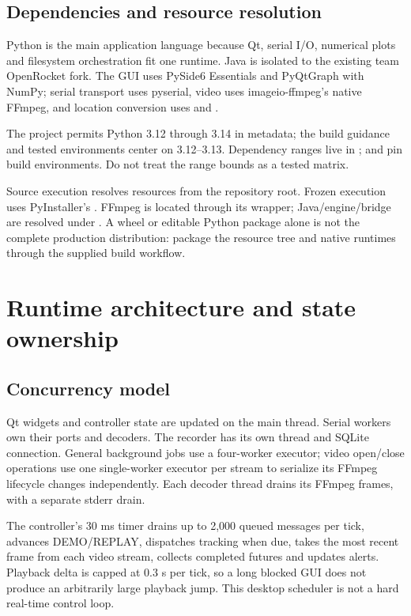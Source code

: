 \subsection{Dependencies and resource resolution}
Python is the main application language because Qt, serial I/O, numerical plots
and filesystem orchestration fit one runtime. Java is isolated to the existing
team OpenRocket fork. The GUI uses PySide6 Essentials and PyQtGraph with NumPy;
serial transport uses pyserial, video uses imageio-ffmpeg's native FFmpeg, and
location conversion uses  and .

The project permits Python 3.12 through 3.14 in metadata; the build guidance and
tested environments center on 3.12--3.13. Dependency ranges live in
;  and  pin build
environments. Do not treat the range bounds as a tested matrix.

Source execution resolves resources from the repository root. Frozen execution
uses PyInstaller's . FFmpeg is located through its wrapper;
Java/engine/bridge are resolved under . A wheel or editable Python
package alone is not the complete production distribution: package the resource
tree and native runtimes through the supplied build workflow.

\section{Runtime architecture and state ownership}\label{sec:runtime}

\subsection{Concurrency model}
Qt widgets and controller state are updated on the main thread. Serial workers
own their ports and decoders. The recorder has its own thread and SQLite
connection. General background jobs use a four-worker executor; video open/close
operations use one single-worker executor per stream to serialize its FFmpeg
lifecycle changes independently. Each decoder thread drains its FFmpeg frames,
with a separate stderr drain.

The controller's 30 ms timer drains up to 2,000 queued messages per tick,
advances DEMO/REPLAY, dispatches tracking when due, takes the most recent frame from each
video stream, collects completed futures and updates alerts. Playback delta is capped
at 0.3 s per tick, so a long blocked GUI does not produce an arbitrarily large
playback jump. This desktop scheduler is not a hard real-time control loop.

